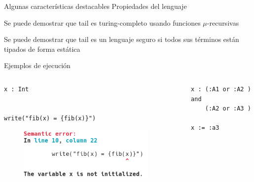 \documentclass[compress]{beamer}
\begin{document}
\begin{frame}{Algunas características destacables}
	{Propiedades del lenguaje}
	\begin{block}{}
		Se puede demostrar que tail es turing-completo usando funciones $\mu$-recursivas
	\end{block}
	\bigskip
	\bigskip
	\begin{block}{}
		Se puede demostrar que tail es un lenguaje seguro si todos sus términos están tipados de forma estática
	\end{block}
\end{frame}

\begin{frame}[fragile]{Ejemplos de ejecución}
	\begin{columns}
		\begin{column}{0.47\paperwidth}
			\begin{lstlisting}[style=tail]
x : Int
			
			
write("fib(x) = {fib(x)}")
			\end{lstlisting}
			
			\begin{figure}[h]
				\begin{center}
					\includegraphics[width=0.9\textwidth]{img/fib4.png}
				\end{center}
			\end{figure}
		\end{column}
	
		\begin{column}{0.47\paperwidth}
			\vspace{0.23cm}
			\begin{lstlisting}[style=tail]
x : (:A1 or :A2 ) and
    (:A2 or :A3 )
			
x := :a3
			\end{lstlisting}
			

\end{column}
\end{columns}
\end{frame}
\end{document}
